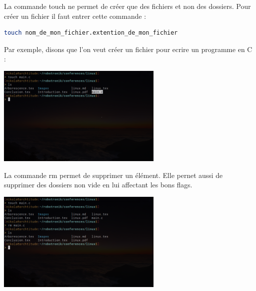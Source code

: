 La commande touch ne permet de créer que des fichiers et non des dossiers. Pour créer un fichier il faut entrer cette commande :
\begin{lstlisting}[language=bash]
	touch nom_de_mon_fichier.extention_de_mon_fichier
\end{lstlisting}

Par exemple, disons que l'on veut créer un fichier pour ecrire un programme en C :

\begin{center}
	\includegraphics[width=0.6\textwidth]{Images/touch.png}
\end{center}

La commande rm permet de supprimer un élément. Elle pernet aussi de supprimer des dossiers non vide en lui affectant les bons flags.

\begin{center}
	\includegraphics[width=0.6\textwidth]{Images/rm.png}
\end{center}

